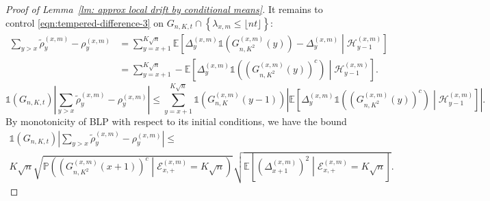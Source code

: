 \documentclass[twoside,12pt, a4paper, final]{article}
\numberwithin{equation}{section}
\theoremstyle{remark}
\begin{document}
\begin{proof}[Proof of Lemma~\ref{lm: approx local drift by conditional means}]
		It remains to control  \eqref{eqn:tempered-difference-3} on $G_{n, K, t} \cap \left\{\lambda_{x,m} \leq\lfloor nt \rfloor \right\}$:
		\begin{align*}
			\sum_{y > x} \tilde\rho_y^{(x,m)} - \rho_y^{(x,m)}
			&= \sum_{y = x + 1}^{K \sqrt{n} } \mathbb{E}\left[ \Delta_y^{(x,m)}\mathbb{1}\left( G_{n, K^2}^{(x,m)}(y) \right) - \Delta_{y}^{(x,m)} \middle| \mathcal{H}_{y-1}^{(x,m)}  \right]  \\
			&= \sum_{y = x + 1}^{K \sqrt{n} } -\mathbb{E}\left[ \Delta_y^{(x,m)}\mathbb{1}\left( \left( G_{n, K^2}^{(x,m)}(y) \right) ^c \right) \middle| \mathcal{H}_{y-1}^{(x,m)}  \right]
			.\end{align*}
		\[
		\mathbb{1}(G_{n, K, t}) \left| 
		\sum_{y > x} \tilde\rho_y^{(x,m)} - \rho_y^{(x,m)}
		\right| 
		\le  \sum_{y = x + 1}^{K \sqrt{n} } \mathbb{1}\left(G_{n, K}^{(x,m)}(y-1)\right) 
		\left|  \mathbb{E}\left[ \Delta_y^{(x,m)}\mathbb{1}\left( \left( G_{n, K^2}^{(x,m)}(y) \right) ^c \right) \middle| \mathcal{H}_{y-1}^{(x,m)}  \right] \right| 
		.\] 
		By monotonicity of BLP with respect to its initial conditions, we have the bound
		\begin{multline*}
			\mathbb{1}(G_{n, K, t})
			\left| \sum_{y > x} \tilde\rho_y^{(x,m)} - \rho_y^{(x,m)} \right| \le \\
			K \sqrt{n} 
			\sqrt{ \mathbb{P}\left( \left( G^{(x,m)}_{n, K^2}(x+1) \right) ^{c} \middle| \mathcal{E}_{x,+}^{(x,m)} = K \sqrt{n}  \right) }
			\sqrt{ \mathbb{E}\left[ \left(\Delta_{x+1}^{(x,m)}\right)^2 \middle| \mathcal{E}_{x,+}^{(x,m)} = K \sqrt{n}  \right]}
			.\end{multline*}
		

\end{proof}
\end{document}
